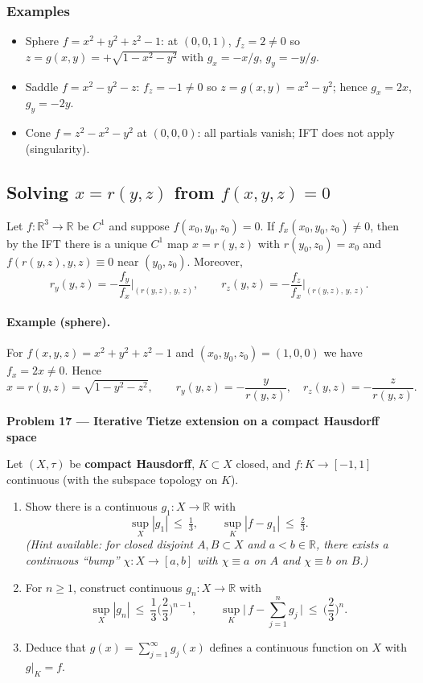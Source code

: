 \documentclass[12pt,a4paper]{article}
\theoremstyle{plain}
\theoremstyle{definition}
\theoremstyle{remark}
\theoremstyle{remark}
\newcommand{\probheader}[1]{%
	\par\vspace{8pt}%
	{\Large\bfseries #1\par}%
	\vspace{6pt}%
}
\begin{document}
	\subsubsection*{Examples}
	\begin{itemize}
		\item Sphere $f=x^2+y^2+z^2-1$: at $(0,0,1)$, $f_z=2\ne0$ so $z=g(x,y)=+\sqrt{1-x^2-y^2}$ with
		$g_x=-x/g$, $g_y=-y/g$.
		\item Saddle $f=x^2-y^2-z$: $f_z=-1\ne0$ so $z=g(x,y)=x^2-y^2$; hence $g_x=2x$, $g_y=-2y$.
		\item Cone $f=z^2-x^2-y^2$ at $(0,0,0)$: all partials vanish; IFT does not apply (singularity).
	\end{itemize}
	
	\subsection*{Solving $x=r(y,z)$ from $f(x,y,z)=0$}
	
	Let \(f:\mathbb{R}^3\to\mathbb{R}\) be \(C^1\) and suppose \(f(x_0,y_0,z_0)=0\).
	If \(f_x(x_0,y_0,z_0)\neq 0\), then by the IFT there is a unique \(C^1\) map
	\(x = r(y,z)\) with \(r(y_0,z_0)=x_0\) and \(f(r(y,z),y,z)\equiv 0\) near \((y_0,z_0)\).
	Moreover,
	\[
	r_y(y,z)= -\frac{f_y}{f_x}\Big|_{(r(y,z),\,y,\,z)},
	\qquad
	r_z(y,z)= -\frac{f_z}{f_x}\Big|_{(r(y,z),\,y,\,z)}.
	\]
	
	\paragraph{Example (sphere).}
	For \(f(x,y,z)=x^2+y^2+z^2-1\) and \((x_0,y_0,z_0)=(1,0,0)\) we have \(f_x=2x\neq0\).
	Hence
	\[
	x=r(y,z)=\sqrt{1-y^2-z^2},
	\qquad
	r_y(y,z)=-\frac{y}{r(y,z)},\quad r_z(y,z)=-\frac{z}{r(y,z)}.
	\]
	
	\probheader{Problem 17 — Iterative Tietze extension on a compact Hausdorff space}
	
	
		Let $(X,\tau)$ be \textbf{compact Hausdorff}, $K\subset X$ closed, and $f:K\to[-1,1]$ continuous (with the subspace topology on $K$).
	
	\begin{enumerate}[label=(\alph*), leftmargin=1.2cm]
		\item Show there is a continuous $g_1:X\to\mathbb R$ with
		\[
		\sup_X |g_1|\ \le\ \tfrac{1}{3}, 
		\qquad
		\sup_K |f-g_1|\ \le\ \tfrac{2}{3}.
		\]
		\emph{(Hint available: for closed disjoint $A,B\subset X$ and $a<b\in\mathbb R$, there exists a continuous ``bump'' $\chi:X\to[a,b]$ with $\chi\equiv a$ on $A$ and $\chi\equiv b$ on $B$.)}
		
		\item For $n\ge 1$, construct continuous $g_n:X\to\mathbb R$ with
		\[
		\sup_X |g_n|\ \le\ \frac{1}{3}\Big(\frac{2}{3}\Big)^{n-1},
		\qquad
		\sup_K\Big|\,f-\sum_{j=1}^{n} g_j\,\Big|\ \le\ \Big(\frac{2}{3}\Big)^{n}.
		\]
		
		\item Deduce that $g(x)=\sum_{j=1}^{\infty} g_j(x)$ defines a continuous function on $X$
		with $g|_{K}=f$.
	\end{enumerate}
	
\end{document}
